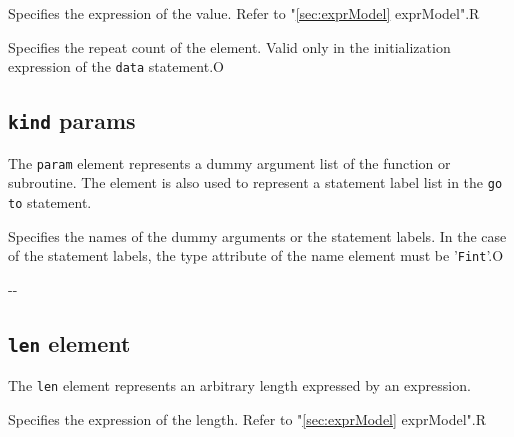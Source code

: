 \begin{XcodeMLChildElements}
{Specifies the expression of the value.
 Refer to "\ref{sec:exprModel} exprModel".}{R}
\end{XcodeMLChildElements}

\begin{XcodeMLAttributes}
{Specifies the repeat count of the element.
 Valid only in the initialization expression of the {\tt data} statement.}{O}
\end{XcodeMLAttributes}


\subsection{ {\tt kind} params}

The {\tt param} element represents a dummy argument list of the function or subroutine.
The element is also used to represent a statement label list in the {\tt go to} statement.


\begin{XcodeMLChildElements}
{Specifies the names of the dummy arguments or the statement labels.
 In the case of the statement labels, the type attribute of the name element must be '{\tt Fint}'.}{O}
\end{XcodeMLChildElements}

\begin{XcodeMLAttributes}
\XcodeMLAttrDef{-}{-}
{-}{-}
\end{XcodeMLAttributes}


\subsection{ {\tt len} element}

The {\tt len} element represents an arbitrary length expressed by an expression.


\begin{XcodeMLChildElements}
{Specifies the expression of the length. Refer to "\ref{sec:exprModel} exprModel".}{R}
\end{XcodeMLChildElements}

